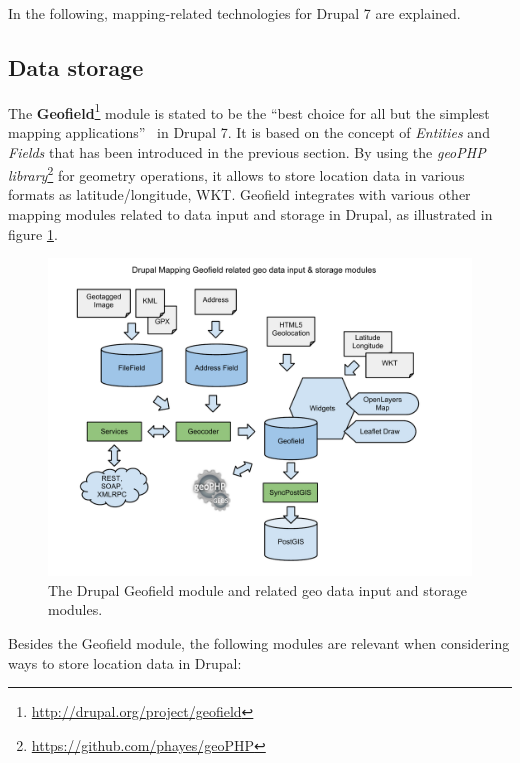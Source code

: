 In the following, mapping-related technologies for Drupal 7 are explained. 

\subsection{Data storage}
    \label{chapter:data-storage}

The \textbf{Geofield}\footnote{\url{http://drupal.org/project/geofield}} module is stated to be the ``best choice for all but the simplest mapping applications''~\cite[page 27]{Zzolo11mappingdrupal} in Drupal 7. It is based on the concept of \textit{Entities} and \textit{Fields} that has been introduced in the previous section. By using the \textit{geoPHP library}\footnote{\url{https://github.com/phayes/geoPHP}} for geometry operations, it allows to store location data in various formats as latitude/longitude, WKT. Geofield integrates with various other mapping modules related to data input and storage in Drupal, as illustrated in figure \ref{fig:geofield}.

\begin{figure}[h]
  \begin{center}
    \includegraphics[width=1.2\textwidth]{figures/drupal_mapping_geofield.pdf}
    \caption{The Drupal Geofield module and related geo data input and storage modules.}
    \label{fig:geofield}
  \end{center}
\end{figure}

Besides the Geofield module, the following modules are relevant when considering ways to store location data in Drupal: 

